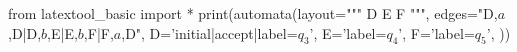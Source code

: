 from latextool_basic import *
print(automata(layout="""
   D  E  F
""",
edges="D,$a$,D|D,$b$,E|E,$b$,F|F,$a$,D",
D='initial|accept|label=$q_3$',
E='label=$q_4$',
F='label=$q_5$',
))
